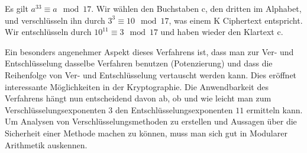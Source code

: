 \documentclass[%
11pt,%
twoside,%
titlepage,%
german,%
headsepline%
]{scrartcl}
\begin{document}
\begin{bsp}
Es gilt $a^{33}\equiv a\mod17$. Wir wählen den Buchstaben c, den dritten im Alphabet, und verschlüsseln ihn durch $3^3\equiv10\mod17$, was einem K Ciphertext entspricht. Wir entschlüsseln durch $10^{11}\equiv3\mod17$ und haben wieder den Klartext c.
\end{bsp}

Ein besonders angenehmer Aspekt dieses Verfahrens ist, dass man zur Ver- und Entschlüsselung dasselbe Verfahren benutzen (Potenzierung) und dass die Reihenfolge von Ver- und Entschlüsselung vertauscht werden kann. Dies eröffnet interessante Möglichkeiten in der Kryptographie. Die Anwendbarkeit des Verfahrens hängt nun entscheidend davon ab, ob und wie leicht man zum Verschlüsselungsexponenten $3$ den Entschlüsselungsexponenten $11$ ermitteln kann. Um Analysen von Verschlüsselungsmethoden zu erstellen und Aussagen über die Sicherheit einer Methode machen zu können, muss man sich gut in Modularer Arithmetik auskennen.

\clearpage

\appendix
\end{document}
